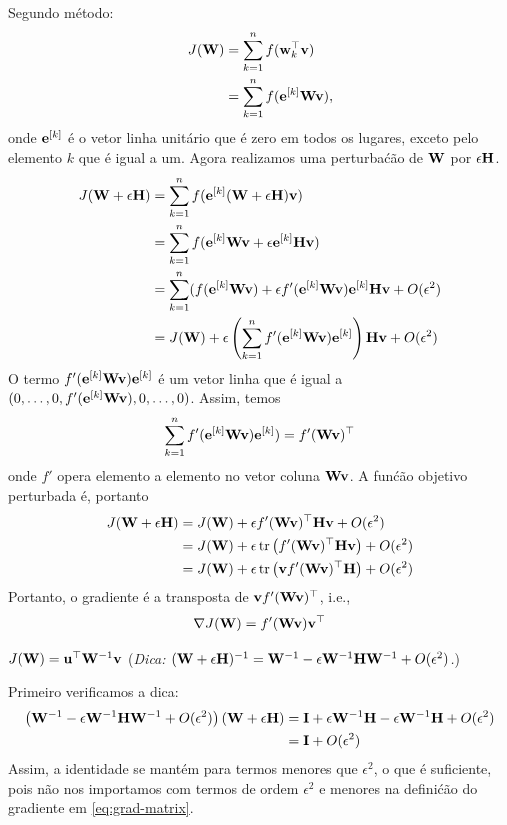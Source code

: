\begin{exenumerate}
\begin{solution}
        Segundo m\'etodo:
        \begin{align}
            J(\mathbf{W}) &= \sum_{k=1}^n f(\mathbf{w}_k^\top\mathbf{v})\\
            &= \sum_{k=1}^n f(\mathbf{e}^{[k]}\mathbf{W}\mathbf{v}),
        \end{align}
        onde $\mathbf{e}^{[k]}$ \'e o vetor linha unit\'ario que \'e zero em todos os lugares, exceto pelo elemento $k$ que \'e igual a um. Agora realizamos uma perturba\'c\~ao de $\mathbf{W}$ por $\epsilon \mathbf{H}$.
        \begin{align}
            J(\mathbf{W} + \epsilon \mathbf{H}) &= \sum_{k=1}^n f(\mathbf{e}^{[k]}(\mathbf{W} + \epsilon \mathbf{H})\mathbf{v}) \\
            &= \sum_{k=1}^n f(\mathbf{e}^{[k]}\mathbf{W}\mathbf{v} + \epsilon\mathbf{e}^{[k]}\mathbf{H}\mathbf{v}) \\
            &= \sum_{k=1}^n (f(\mathbf{e}^{[k]}\mathbf{W}\mathbf{v}) + \epsilon f'(\mathbf{e}^{[k]}\mathbf{W}\mathbf{v})\mathbf{e}^{[k]}\mathbf{H}\mathbf{v} + O(\epsilon^2)\\
            &= J(\mathbf{W}) + \epsilon \left( \sum_{k=1}^n  f'(\mathbf{e}^{[k]}\mathbf{W}\mathbf{v})\mathbf{e}^{[k]}\right) \mathbf{H} \mathbf{v} + O(\epsilon^2)
        \end{align}
        O termo $f'(\mathbf{e}^{[k]}\mathbf{W}\mathbf{v}) \mathbf{e}^{[k]}$ \'e um vetor linha que \'e igual a $(0, \ldots, 0,f'(\mathbf{e}^{[k]}\mathbf{W}\mathbf{v}), 0, \ldots, 0)$. Assim, temos
        \begin{equation}
            \sum_{k=1}^n  f'(\mathbf{e}^{[k]}\mathbf{W}\mathbf{v})\mathbf{e}^{[k]}) = f'(\mathbf{W}\mathbf{v})^\top
        \end{equation}
        onde $f'$ opera elemento a elemento no vetor coluna $\mathbf{W}\mathbf{v}$. A fun\'c\~ao objetivo perturbada \'e, portanto
        \begin{align}
            J(\mathbf{W} + \epsilon \mathbf{H}) & = J(\mathbf{W}) + \epsilon f'(\mathbf{W}\mathbf{v})^\top \mathbf{H} \mathbf{v}  + O(\epsilon^2)\\
            & =  J(\mathbf{W}) + \epsilon \operatorname{tr}\left(f'(\mathbf{W}\mathbf{v})^\top \mathbf{H} \mathbf{v}\right)  + O(\epsilon^2)\\
            & =  J(\mathbf{W}) + \epsilon \operatorname{tr}\left(\mathbf{v} f'(\mathbf{W}\mathbf{v})^\top \mathbf{H} \right)  + O(\epsilon^2)
        \end{align}
        Portanto, o gradiente \'e a transposta de $\mathbf{v} f'(\mathbf{W}\mathbf{v})^\top$, i.e.,
        \begin{equation}
            \nabla J(\mathbf{W}) = f'(\mathbf{W}\mathbf{v}) \mathbf{v}^\top
        \end{equation}
    \end{solution}
    
    \item $J(\mathbf{W}) = \mathbf{u}^\top \mathbf{W}^{-1}\mathbf{v}$ (\emph{Dica: $(\mathbf{W}+\epsilon \mathbf{H})^{-1} = \mathbf{W}^{-1} -\epsilon \mathbf{W}^{-1}\mathbf{H}\mathbf{W}^{-1}+O(\epsilon^2)$.})
    \begin{solution}
        Primeiro verificamos a dica:
        \begin{align}
            \left(\mathbf{W}^{-1} -\epsilon \mathbf{W}^{-1}\mathbf{H}\mathbf{W}^{-1}+O(\epsilon^2)\right) (\mathbf{W}+\epsilon \mathbf{H})&=  \mathbf{I} + \epsilon \mathbf{W}^{-1} \mathbf{H} - \epsilon \mathbf{W}^{-1}\mathbf{H} + O(\epsilon^2)\\
            &= \mathbf{I} + O(\epsilon^2)
        \end{align}
        Assim, a identidade se mant\'em para termos menores que $\epsilon^2$, o que \'e
        suficiente, pois n\~ao nos importamos com termos de ordem $\epsilon^2$ e menores 
        na defini\'c\~ao do gradiente em \eqref{eq:grad-matrix}.
        

\end{solution}
\end{exenumerate}
